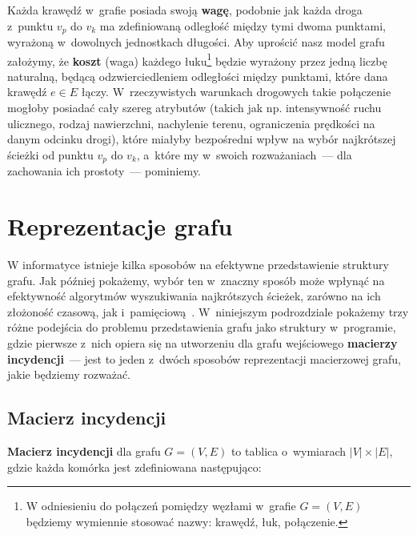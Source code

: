 Każda krawędź w~grafie posiada swoją \textbf{wagę}, podobnie jak każda droga z~punktu $v_{p}$ do $v_{k}$ ma zdefiniowaną odległość między tymi dwoma punktami, wyrażoną w~dowolnych jednostkach długości.
Aby uprościć nasz model grafu założymy, że \textbf{koszt} (waga) każdego łuku\footnote{
	W odniesieniu do połączeń pomiędzy węzłami w~grafie $G = \left( V, E \right)$ będziemy wymiennie stosować nazwy: krawędź, łuk, połączenie.
} będzie wyrażony przez jedną liczbę naturalną, będącą odzwierciedleniem odległości między punktami, które dana krawędź $e \in E$ łączy.
W~rzeczywistych warunkach drogowych takie połączenie mogłoby posiadać cały szereg atrybutów (takich jak np. intensywność ruchu ulicznego, rodzaj nawierzchni, nachylenie terenu, ograniczenia prędkości na danym odcinku drogi), które miałyby bezpośredni wpływ na wybór najkrótszej ścieżki od punktu $v_{p}$ do $v_{k}$, a~które my w~swoich rozważaniach~--- dla zachowania ich prostoty~--- pominiemy.




\section{Reprezentacje grafu}




W informatyce istnieje kilka sposobów na efektywne przedstawienie struktury grafu.
Jak później pokażemy, wybór ten w~znaczny sposób może wpłynąć na efektywność algorytmów wyszukiwania najkrótszych ścieżek, zarówno na ich złożoność czasową, jak i~pamięciową~\cite[$7$ -- $10$]{eCOMPASS_TR_005}.
W~niniejszym podrozdziale pokażemy trzy różne podejścia do problemu przedstawienia grafu jako struktury w~programie, gdzie pierwsze z~nich opiera się na utworzeniu dla grafu wejściowego \textbf{macierzy incydencji}~--- jest to jeden z~dwóch sposobów reprezentacji macierzowej grafu, jakie będziemy rozważać.



\subsection{Macierz incydencji}



\textbf{Macierz incydencji} dla grafu $G = \left( V, E \right)$ to tablica o~wymiarach $\left| V \right| \times \left| E \right|$, gdzie każda komórka jest zdefiniowana następująco:

